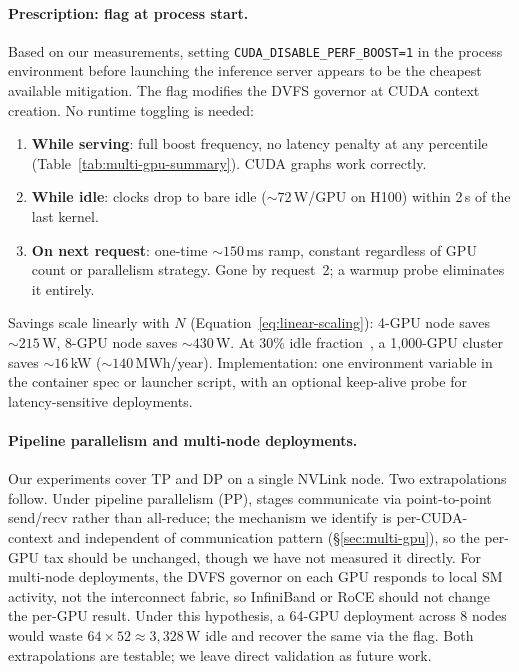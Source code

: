 \documentclass[sigconf,nonacm]{acmart}
\newcommand{\perfboost}{\texttt{CUDA\_\hspace{0pt}DISABLE\_\hspace{0pt}PERF\_\hspace{0pt}BOOST}}
\begin{document}
\paragraph{Prescription: flag at process start.}
\label{sec:prescription}
Based on our measurements, setting \perfboost\texttt{=1} in the process environment before launching the inference server appears to be the cheapest available mitigation. The flag modifies the DVFS governor at CUDA context creation. No runtime toggling is needed:
\begin{enumerate}
    \item \textbf{While serving}: full boost frequency, no latency penalty at any percentile (Table~\ref{tab:multi-gpu-summary}). CUDA graphs work correctly.
    \item \textbf{While idle}: clocks drop to bare idle (${\sim}72$\,W/GPU on H100) within 2\,s of the last kernel.
    \item \textbf{On next request}: one-time ${\sim}150$\,ms ramp, constant regardless of GPU count or parallelism strategy. Gone by request~2; a warmup probe eliminates it entirely.
\end{enumerate}
Savings scale linearly with $N$ (Equation~\ref{eq:linear-scaling}): 4-GPU node saves ${\sim}215$\,W, 8-GPU node saves ${\sim}430$\,W. At 30\% idle fraction~\cite{flexera,lei-idle}, a 1{,}000-GPU cluster saves ${\sim}16$\,kW (${\sim}140$\,MWh/year). Implementation: one environment variable in the container spec or launcher script, with an optional keep-alive probe for latency-sensitive deployments.

\paragraph{Pipeline parallelism and multi-node deployments.}
Our experiments cover TP and DP on a single NVLink node. Two extrapolations follow. Under pipeline parallelism (PP), stages communicate via point-to-point send/recv rather than all-reduce; the mechanism we identify is per-CUDA-context and independent of communication pattern (\S\ref{sec:multi-gpu}), so the per-GPU tax should be unchanged, though we have not measured it directly. For multi-node deployments, the DVFS governor on each GPU responds to local SM activity, not the interconnect fabric, so InfiniBand or RoCE should not change the per-GPU result. Under this hypothesis, a 64-GPU deployment across 8 nodes would waste $64 \times 52 \approx 3{,}328$\,W idle and recover the same via the flag. Both extrapolations are testable; we leave direct validation as future work.
\end{document}
